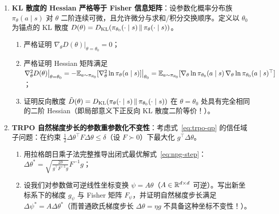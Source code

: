 \begin{enumerate}
  \item[\textbf{6.3.3}] \textbf{KL 散度的 Hessian 严格等于 Fisher 信息矩阵}：设参数化概率分布族 $\pi_\theta(a \mid s)$ 对 $\theta$ 二阶连续可微，且允许微分与求和/积分交换顺序。定义以 $\theta_0$ 为锚点的 KL 散度 $D(\theta) = D_{\mathrm{KL}}(\pi_{\theta_0}(\cdot \mid s) \,\|\, \pi_\theta(\cdot \mid s))$。
  \begin{enumerate}
    \item 严格证明 $\nabla_\theta D(\theta)\big|_{\theta=\theta_0} = 0$；
    \item 严格证明 Hessian 矩阵满足 $\nabla_\theta^2 D(\theta)\big|_{\theta=\theta_0} = -\mathbb{E}_{a \sim \pi_{\theta_0}}[\nabla_\theta^2 \ln \pi_\theta(a \mid s)]\big|_{\theta_0} = \mathbb{E}_{a \sim \pi_{\theta_0}}[\nabla_\theta \ln \pi_{\theta_0}(a \mid s)\,\nabla_\theta \ln \pi_{\theta_0}(a \mid s)^\top]$；
    \item 证明反向散度 $\tilde{D}(\theta) = D_{\mathrm{KL}}(\pi_\theta(\cdot \mid s) \,\|\, \pi_{\theta_0}(\cdot \mid s))$ 在 $\theta = \theta_0$ 处具有完全相同的二阶 Hessian（即局部意义下正反向 KL 散度二阶等价！）。
  \end{enumerate}

  \item[\textbf{6.3.4}] \textbf{TRPO 自然梯度步长的参数重参数化不变性}：考虑式~\eqref{eq:trpo-qp} 的信任域子问题：在约束 $\frac{1}{2}\Delta\theta^\top F\Delta\theta \le \delta$（设 $F \succ 0$）下最大化 $g^\top \Delta\theta$。
  \begin{enumerate}
    \item 用拉格朗日乘子法完整推导出闭式最优解式~\eqref{eq:npg-step}：$\Delta\theta^* = \sqrt{\frac{2\delta}{g^\top F^{-1} g}} F^{-1} g$；
    \item 设我们对参数做可逆线性坐标变换 $\psi = A\theta$（$A \in \mathbb{R}^{d \times d}$ 可逆）。写出新坐标系下的梯度 $g_\psi$ 与 Fisher 矩阵 $F_\psi$，并证明自然梯度步长满足 $\Delta\psi^* = A \Delta\theta^*$（而普通欧氏梯度步长 $\Delta\theta = \eta g$ 不具备这种坐标不变性！）。
  \end{enumerate}
\end{enumerate}

